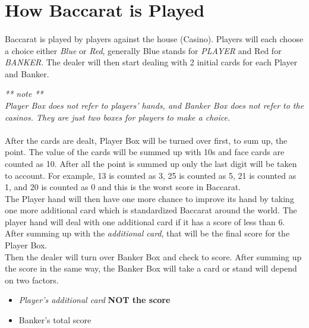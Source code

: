 \documentclass{article}
\begin{document}
\clearpage
\section{How Baccarat is Played}
\paragraph{}
Baccarat is played by players against the house (Casino).  Players will each choose a choice either \emph{Blue} or \emph{Red}, generally Blue stands for \emph{PLAYER} and Red for \emph{BANKER}.  The dealer will then start dealing with 2 initial cards for each Player and Banker.  \par
\begin{center}
\emph{** note **}\\
\textit{Player Box does not refer to players' hands, and Banker Box does not refer to the casinos. They are just two boxes for players to make a choice.}\\
\end{center}

\paragraph{}
After the cards are dealt, Player Box will be turned over first, to sum up, the point.  The value of the cards will be summed up with 10s and face cards are counted as 10.  After all the point is summed up only the last digit will be taken to account.  For example, 13 is counted as 3, 25 is counted as 5, 21 is counted as 1, and 20 is counted as 0 and this is the worst score in Baccarat.\\

The Player hand will then have one more chance to improve its hand by taking one more additional card which is standardized Baccarat around the world.  The player hand will deal with one additional card if it has a score of less than 6.  After summing up with the \emph{additional card}, that will be the final score for the Player Box.  \\

Then the dealer will turn over Banker Box and check to score.  After summing up the score in the same way, the Banker Box will take a card or stand will depend on two factors.

\begin{itemize}
\item \emph{Player's additional card} \textbf{NOT the score}
\item Banker's total score
\end{itemize}
\end{document}
